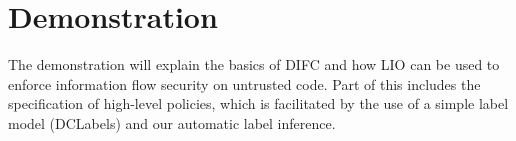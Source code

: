 \section{Demonstration}
\label{sec:demo}
The demonstration will explain the basics of DIFC and how LIO can be
used to enforce information flow security on untrusted code.
%
Part of this includes the specification of high-level policies, which
is facilitated by the use of a simple label model (DCLabels) and our
automatic label inference.
